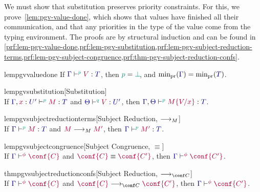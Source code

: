 \documentclass[main.tex]{subfiles}
\begin{document}
We must show that substitution preserves priority constraints. For this, we prove~\cref{lem:pgv-value-done}, which shows that values have finished all their communication, and that any priorities in the type of the value come from the typing environment. The proofs are by structural induction and can be found in \cref{prf:lem-pgv-value-done,prf:lem-pgv-substitution,prf:lem-pgv-subject-reduction-terms,prf:lem-pgv-subject-congruence,prf:thm-pgv-subject-reduction-confs}.
\begin{compacttheorems}
  \begin{restatablelemma}{lempgvvaluedone}
    \label{lem:pgv-value-done}
    If $\tseq[\cs{p}]{\ty{\Gamma}}{V}{T}$, then $\cs{p}=\cs{\pbot}$, and $\minpr(\ty{\Gamma})=\minpr(\ty{T})$.
  \end{restatablelemma}
  \begin{restatablelemma}{lempgvsubstitution}[Substitution]
    \label{lem:pgv-substitution}
    \hfill\\%
    If $\tseq[\cs{p}]{\ty{\Gamma},\tmty{x}{U'}}{M}{T}$ and $\tseq[\cs{q}]{\ty{\Theta}}{V}{U'}$, then $\tseq[\cs{p}]{\ty{\Gamma},\ty{\Theta}}{\subst{M}{V}{x}}{T}$.
  \end{restatablelemma}
  \begin{restatablelemma}{lempgvsubjectreductionterms}[Subject Reduction, $\longrightarrow_{M}$]
    \label{lem:pgv-subject-reduction-terms}
    \hfill\\%
    If $\tseq[\cs{p}]{\ty{\Gamma}}{M}{T}$ and $\tm{M}\tred\tm{M'}$,
    then $\tseq[\cs{p}]{\ty{\Gamma}}{M'}{T}$.
  \end{restatablelemma}
  \begin{restatablelemma}{lempgvsubjectcongruence}[Subject Congruence, $\equiv$]
    \label{lem:pgv-subject-congruence}
    \hfill\\%
    If $\cseq[\phi]{\ty{\Gamma}}{\conf{C}}$ and $\tm{\conf{C}}\equiv\tm{\conf{C'}}$,
    then $\cseq[\phi]{\ty{\Gamma}}{\conf{C'}}$.
  \end{restatablelemma}
  \begin{restatabletheorem}{thmpgvsubjectreductionconfs}[Subject Reduction, $\cred$]
    \label{thm:pgv-subject-reduction-confs}
    \hfill\\%
    If $\cseq[\phi]{\ty{\Gamma}}{\conf{C}}$ and $\tm{\conf{C}}\cred\tm{\conf{C'}}$,
    then $\cseq[\phi]{\ty{\Gamma}}{\conf{C'}}$.
  \end{restatabletheorem}
\end{compacttheorems}
\end{document}
